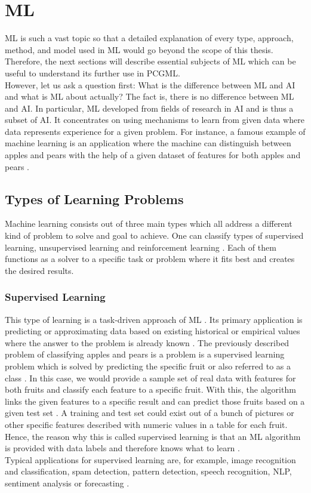 \documentclass[MGS,Master,english]{twbook}%
\begin{document}
\chapter{\acl{ML}} \label{chapter::machineLearning}
\ac{ML} is such a vast topic so that a detailed explanation of every type, approach, method, and model used in ML would go beyond the scope of this thesis. Therefore, the next sections will describe essential subjects of ML which can be useful to understand its further use in PCGML. \\
However, let us ask a question first: What is the difference between ML and AI and what is ML about actually? The fact is, there is no difference between ML and AI. In particular, ML developed from fields of research in AI and is thus a subset of AI. It concentrates on using mechanisms to learn from given data where data represents experience for a given problem. For instance, a famous example of machine learning is an application where the machine can distinguish between apples and pears with the help of a given dataset of features for both apples and pears \cite{ai::book}. 

\section{Types of Learning Problems}
Machine learning consists out of three main types which all address a different kind of problem to solve and goal to achieve. One can classify types of supervised learning, unsupervised learning and reinforcement learning \cite{ml::book::developer}. Each of them functions as a solver to a specific task or problem where it fits best and creates the desired results.

\subsection{Supervised Learning}
This type of learning is a task-driven approach of ML \cite{ml::book::developer}. Its primary application is predicting or approximating data based on existing historical or empirical values where the answer to the problem is already known \cite{ai::book}. The previously described problem of classifying apples and pears is a problem is a supervised learning problem which is solved by predicting the specific fruit or also referred to as a class \cite{ml::book::developer}. In this case, we would provide a sample set of real data with features for both fruits and classify each feature to a specific fruit. With this, the algorithm links the given features to a specific result and can predict those fruits based on a given test set \cite{ml::book::developer}. A training and test set could exist out of a bunch of pictures or other specific features described with numeric values in a table for each fruit. Hence, the reason why this is called supervised learning is that an ML algorithm is provided with data labels and therefore knows what to learn \cite{ai::book}.\\
Typical applications for supervised learning are, for example, image recognition and classification, spam detection, pattern detection, speech recognition, \ac{NLP}, sentiment analysis or forecasting \cite{ml::book::algorithms}.
\end{document}
